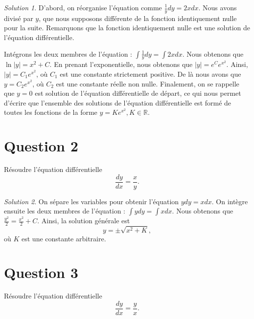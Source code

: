 \documentclass[
  12pt,
  letterpaper,
]{book}
\theoremstyle{remark}
\newtheorem*{solution}{Solution}
\begin{document}
\begin{solution}

D'abord, on réorganise l'équation comme \(\frac{1}{y}dy = 2x dx\). Nous
avons divisé par \(y\), que nous supposons différente de la fonction
identiquement nulle pour la suite. Remarquons que la fonction
identiquement nulle est une solution de l'équation différentielle.

Intégrons les deux membres de l'équation :
\(\int \frac{1}{y}dy = \int 2x dx\). Nous obtenons
que\(\ln|y| = x^2 + C\). En prenant l'exponentielle, nous obtenons que
\(|y|=e^{C}e^{x^2}\). Ainsi, \(|y|=C_1e^{x^2}\), où \(C_1\) est une
constante strictement positive. De là nous avons que \(y=C_2e^{x^2}\),
où \(C_2\) est une constante réelle non nulle. Finalement, on se
rappelle que \(y=0\) est solution de l'équation différentielle de
départ, ce qui nous permet d'écrire que l'ensemble des solutions de
l'équation différentielle est formé de toutes les fonctions de la forme
\(y=Ke^{x^2}, K\in\mathbb{R}\).

\end{solution}

\hypertarget{question-2-4}{%
\section{Question 2}\label{question-2-4}}

Résoudre l'équation différentielle \[\frac{dy}{dx} = \frac{x}{y}.\]

\begin{solution}

On sépare les variables pour obtenir l'équation \(y dy = x dx\). On
intègre ensuite les deux membres de l'équation :
\(\int y dy = \int x dx\). Nous obtenons que
\(\frac{y^2}{2} = \frac{x^2}{2} + C\). Ainsi, la solution générale est
\[y = \pm\sqrt{x^2 + K},\] où \(K\) est une constante arbitraire.

\end{solution}

\hypertarget{question-3-4}{%
\section{Question 3}\label{question-3-4}}

Résoudre l'équation différentielle \[\frac{dy}{dx} = \frac{y}{x}.\]
\end{document}
